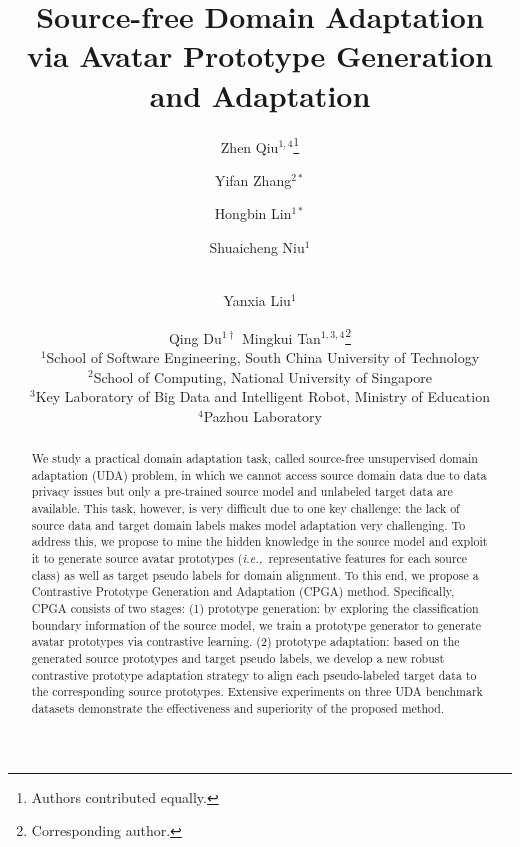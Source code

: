 \documentclass{article}
\title{Source-free Domain Adaptation \\via Avatar Prototype Generation and Adaptation}
\author{
Zhen Qiu$^{1,4}$\thanks{Authors contributed equally.} \and
Yifan Zhang$^{2*}$\and
Hongbin Lin$^{1*}$\and
Shuaicheng Niu$^1$\and
\\
Yanxia Liu$^1$\and
Qing Du$^{1\dag}$\And
Mingkui Tan$^{1,3,4}$\thanks{Corresponding author.}\\
\affiliations
$^1$School of Software Engineering, South China University of Technology\\
$^2$School of Computing, National University of Singapore\\
$^3$Key Laboratory of Big Data and Intelligent Robot, Ministry of Education\\
$^4$Pazhou Laboratory\\
}
\def\ie{\emph{i.e.,~}}
\begin{document}
\maketitle

\begin{abstract}


We study a practical domain adaptation task, called source-free unsupervised domain adaptation (UDA) problem, in which we cannot access source domain data due to data privacy issues but only a pre-trained source model and unlabeled target data are available.  This task, however, is very difficult due to one key challenge: the lack of source data and target domain labels makes model adaptation very challenging. To address this, we propose to mine the hidden knowledge in the source model and exploit it to generate
source avatar prototypes (\ie representative features for each source class) as well as target pseudo labels for domain alignment. To this end, we propose a Contrastive Prototype Generation and Adaptation (CPGA) method.
Specifically, CPGA consists of two stages: (1) prototype generation: by exploring the classification boundary information of the source model, we train a prototype generator to generate avatar prototypes via contrastive learning. (2) prototype adaptation: based on the generated source prototypes and target pseudo labels, we develop a new robust contrastive prototype adaptation strategy to align each pseudo-labeled target data to the corresponding source prototypes. Extensive experiments on three UDA benchmark datasets demonstrate the effectiveness and superiority of the proposed method.
\end{abstract}
\end{document}
